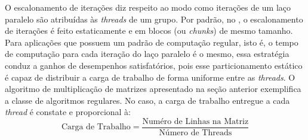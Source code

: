 \documentclass{SBCbookchapter}
\begin{document}
		O escalonamento de iterações diz respeito ao modo como iterações
		de um laço paralelo são atribuídas às \textit{threads} de um
		grupo. Por padrão, no \openmp, o escalonamento de iterações é
		feito estaticamente e em blocos (ou \textit{chunks}) de mesmo
		tamanho. Para aplicações que possuem um padrão de computação
		regular, isto é, o tempo de computação para cada iteração do
		laço paralelo é o mesmo, essa estratégia conduz a ganhos de
		desempenhos satisfatórios, pois esse particionamento estático é
		capaz de distribuir a carga de trabalho de forma uniforme entre
		as \textit{threads}. O algoritmo de multiplicação de matrizes
		apresentado na seção anterior exemplifica a classe de algoritmos
		regulares. No caso, a carga de trabalho entregue a cada
		\textit{thread} é constate e proporcional à:
		\begin{equation}
			\text{Carga de Trabalho} = \dfrac{\text{Numéro de Linhas na Matriz}}%
			                                 {\text{Número de Threads}}
		\end{equation}
		
\end{document}
